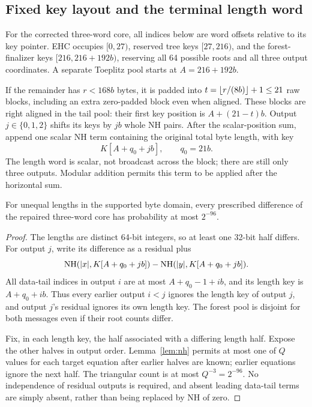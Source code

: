 \subsection{Fixed key layout and the terminal length word}
For the corrected three-word core, all indices below are word offsets relative to its key pointer. EHC occupies $[0,27)$, reserved tree keys $[27,216)$, and the forest-finalizer keys $[216,216+192b)$, reserving all 64 possible roots and all three output coordinates. A separate Toeplitz pool starts at $A=216+192b$.

If the remainder has $r<168b$ bytes, it is padded into $t=\left\lfloor r/(8b)\right\rfloor+1\le21$ raw blocks, including an extra zero-padded block even when aligned. These blocks are right aligned in the tail pool: their first key position is $A+(21-t)b$. Output $j\in\{0,1,2\}$ shifts its keys by $jb$ whole NH pairs. After the scalar-position sum, append one scalar NH term containing the original total byte length, with key
\begin{equation}\label{eq:lengthkey}
 K[A+q_0+jb],\qquad q_0=21b.
\end{equation}
The length word is scalar, not broadcast across the block; there are still only three outputs. Modular addition permits this term to be applied after the horizontal sum.

\begin{lemma}\label{lem:length}
For unequal lengths in the supported byte domain, every prescribed difference of the repaired three-word core has probability at most $2^{-96}$.
\end{lemma}
\begin{proof}
The lengths are distinct 64-bit integers, so at least one 32-bit half differs. For output $j$, write its difference as a residual plus
\[
 \operatorname{NH}(|x|,K[A+q_0+jb])-\operatorname{NH}(|y|,K[A+q_0+jb]).
\]
All data-tail indices in output $i$ are at most $A+q_0-1+ib$, and its length key is $A+q_0+ib$. Thus every earlier output $i<j$ ignores the length key of output $j$, and output $j$'s residual ignores its own length key. The forest pool is disjoint for both messages even if their root counts differ.

Fix, in each length key, the half associated with a differing length half. Expose the other halves in output order. Lemma~\ref{lem:nh} permits at most one of $Q$ values for each target equation after earlier halves are known; earlier equations ignore the next half. The triangular count is at most $Q^{-3}=2^{-96}$. No independence of residual outputs is required, and absent leading data-tail terms are simply absent, rather than being replaced by NH of zero.
\end{proof}


